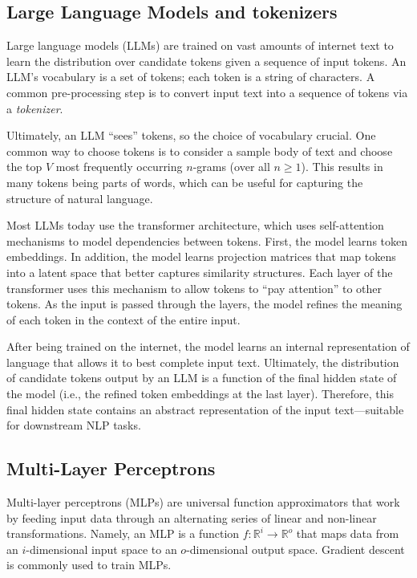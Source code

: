 \documentclass{article}
\begin{document}
\subsection{Large Language Models and tokenizers}

Large language models (LLMs) are trained on vast amounts of internet text to learn the distribution over candidate tokens given a sequence of input tokens. An LLM's vocabulary is a set of tokens; each token is a string of characters. A common pre-processing step is to convert input text into a sequence of tokens via a \emph{tokenizer}.

Ultimately, an LLM ``sees'' tokens, so the choice of vocabulary crucial. One common way to choose tokens is to consider a sample body of text and choose the top $V$ most frequently occurring $n$-grams (over all $n\ge 1$). This results in many tokens being parts of words, which can be useful for capturing the structure of natural language.

Most LLMs today use the transformer architecture, which uses self-attention mechanisms to model dependencies between tokens. First, the model learns token embeddings. In addition, the model learns projection matrices that map tokens into a latent space that better captures similarity structures. Each layer of the transformer uses this mechanism to allow tokens to ``pay attention'' to other tokens. As the input is passed through the layers, the model refines the meaning of each token in the context of the entire input.

After being trained on the internet, the model learns an internal representation of language that allows it to best complete input text. Ultimately, the distribution of candidate tokens output by an LLM is a function of the final hidden state of the model (i.e., the refined token embeddings at the last layer). Therefore, this final hidden state contains an abstract representation of the input text---suitable for downstream NLP tasks.

\subsection{Multi-Layer Perceptrons}

Multi-layer perceptrons (MLPs) are universal function approximators that work by feeding input data through an alternating series of linear and non-linear transformations. Namely, an MLP is a function $f: \mathbb{R}^i \rightarrow \mathbb{R}^o$ that maps data from an $i$-dimensional input space to an $o$-dimensional output space. Gradient descent is commonly used to train MLPs.
\end{document}

